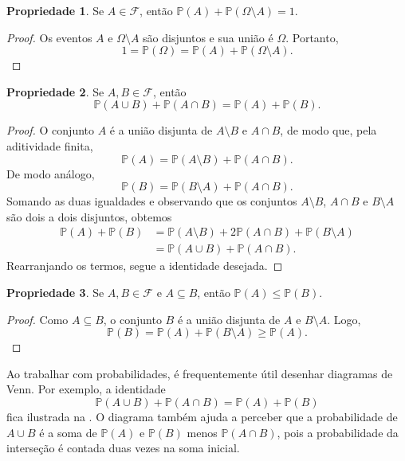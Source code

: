 \documentclass[12pt,portuguese]{article}
\let\leq\leqslant
\let\geq\geqslant
\theoremstyle{definition}
\newtheorem*{property}{Propriedade}
\begin{document}
\begin{property}
Se \(A \in \mathcal{F}\), então
\(\mathbb{P}(A) + \mathbb{P}(\Omega \setminus A) = 1\).
\end{property}

\begin{proof}
Os eventos \(A\) e \(\Omega \setminus A\) são disjuntos e sua união é
\(\Omega\). Portanto,
\[
1 = \mathbb{P}(\Omega) = \mathbb{P}(A) +
\mathbb{P}(\Omega \setminus A).
\]
\end{proof}

\begin{property}
Se \(A, B \in \mathcal{F}\), então
\[
\mathbb{P}(A \cup B) + \mathbb{P}(A \cap B) =
\mathbb{P}(A) + \mathbb{P}(B).
\]
\end{property}

\begin{proof}
O conjunto \(A\) é a união disjunta de \(A \setminus B\) e \(A \cap B\),
de modo que, pela aditividade finita,
\[
\mathbb{P}(A) = \mathbb{P}(A \setminus B) + \mathbb{P}(A \cap B).
\]
De modo análogo,
\[
\mathbb{P}(B) = \mathbb{P}(B \setminus A) + \mathbb{P}(A \cap B).
\]
Somando as duas igualdades e observando que os conjuntos
\(A \setminus B\), \(A \cap B\) e \(B \setminus A\) são dois a dois
disjuntos, obtemos
\[
\begin{aligned}
\mathbb{P}(A) + \mathbb{P}(B)
&= \mathbb{P}(A \setminus B) + 2\mathbb{P}(A \cap B)
+ \mathbb{P}(B \setminus A) \\
&= \mathbb{P}(A \cup B) + \mathbb{P}(A \cap B).
\end{aligned}
\]
Rearranjando os termos, segue a identidade desejada.
\end{proof}

\begin{property}
Se \(A, B \in \mathcal{F}\) e \(A \subseteq B\), então
\(\mathbb{P}(A) \leq \mathbb{P}(B)\).
\end{property}

\begin{proof}
Como \(A \subseteq B\), o conjunto \(B\) é a união disjunta de \(A\) e
\(B \setminus A\). Logo,
\[
\mathbb{P}(B) = \mathbb{P}(A) + \mathbb{P}(B \setminus A)
\geq \mathbb{P}(A).
\]
\end{proof}

Ao trabalhar com probabilidades, é frequentemente útil desenhar diagramas de
Venn. Por exemplo, a identidade
\[
\mathbb{P}(A \cup B) + \mathbb{P}(A \cap B) =
\mathbb{P}(A) + \mathbb{P}(B)
\]
fica ilustrada na . O diagrama também ajuda a perceber que a
probabilidade de \(A \cup B\) é a soma de \(\mathbb{P}(A)\) e
\(\mathbb{P}(B)\) menos \(\mathbb{P}(A \cap B)\), pois a probabilidade da
interseção é contada duas vezes na soma inicial.
\end{document}

